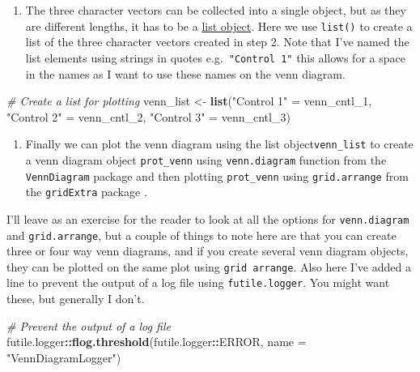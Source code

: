 \documentclass[12pt,]{book}
\newenvironment{Shaded}{\begin{snugshade}}{\end{snugshade}}
\newcommand{\CommentTok}[1]{\textcolor[rgb]{0.56,0.35,0.01}{\textit{#1}}}
\newcommand{\DataTypeTok}[1]{\textcolor[rgb]{0.13,0.29,0.53}{#1}}
\newcommand{\DecValTok}[1]{\textcolor[rgb]{0.00,0.00,0.81}{#1}}
\newcommand{\KeywordTok}[1]{\textcolor[rgb]{0.13,0.29,0.53}{\textbf{#1}}}
\newcommand{\NormalTok}[1]{#1}
\newcommand{\OperatorTok}[1]{\textcolor[rgb]{0.81,0.36,0.00}{\textbf{#1}}}
\newcommand{\StringTok}[1]{\textcolor[rgb]{0.31,0.60,0.02}{#1}}
\providecommand{\tightlist}{%
  \setlength{\itemsep}{0pt}\setlength{\parskip}{0pt}}
\begin{document}
\begin{enumerate}
\def\labelenumi{\arabic{enumi}.}
\setcounter{enumi}{2}
\tightlist
\item
  The three character vectors can be collected into a single object, but as
  they are different lengths, it has to be a \protect\hyperlink{lists}{list object}. Here we use \texttt{list()}
  to create a list of the three character vectors created in step 2. Note that
  I've named the list elements using strings in quotes e.g.~\texttt{"Control\ 1"} this
  allows for a space in the names as I want to use these names on the venn diagram.
\end{enumerate}

\begin{Shaded}
\begin{Highlighting}[]
\CommentTok{# Create a list for plotting}
\NormalTok{venn_list <-}\StringTok{ }\KeywordTok{list}\NormalTok{(}\StringTok{"Control 1"}\NormalTok{ =}\StringTok{ }\NormalTok{venn_cntl_}\DecValTok{1}\NormalTok{,}
                  \StringTok{"Control 2"}\NormalTok{ =}\StringTok{ }\NormalTok{venn_cntl_}\DecValTok{2}\NormalTok{,}
                  \StringTok{"Control 3"}\NormalTok{ =}\StringTok{ }\NormalTok{venn_cntl_}\DecValTok{3}\NormalTok{)}
\end{Highlighting}
\end{Shaded}

\begin{enumerate}
\def\labelenumi{\arabic{enumi}.}
\setcounter{enumi}{3}
\tightlist
\item
  Finally we can plot the venn diagram using the list object\texttt{venn\_list} to
  create a venn diagram object \texttt{prot\_venn} using \texttt{venn.diagram} function from the
  \texttt{VennDiagram} package \citep{R-VennDiagram} and then plotting \texttt{prot\_venn} using
  \texttt{grid.arrange} from the \texttt{gridExtra} package \citep{R-gridExtra}.
\end{enumerate}

I'll leave as an exercise for the reader to look at all the options for
\texttt{venn.diagram} and \texttt{grid.arrange}, but a couple of things to note here are
that you can create three or four way venn diagrams, and if you create
several venn diagram objects, they can be plotted on the same plot using
\texttt{grid\ arrange}. Also here I've added a line to prevent the output of a log file
using \texttt{futile.logger}. You might want these, but generally I don't.



\begin{Shaded}
\begin{Highlighting}[]
\CommentTok{# Prevent the output of a log file}
\NormalTok{futile.logger}\OperatorTok{::}\KeywordTok{flog.threshold}\NormalTok{(futile.logger}\OperatorTok{::}\NormalTok{ERROR, }\DataTypeTok{name =} \StringTok{"VennDiagramLogger"}\NormalTok{)}
\end{Highlighting}
\end{Shaded}
\end{document}
